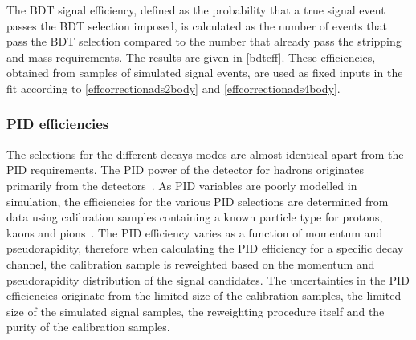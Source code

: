 The BDT signal efficiency, defined as the probability that a true signal event passes the BDT selection imposed, is calculated as the number of events that pass the BDT selection compared to the number that already pass the stripping and mass requirements. The results are given in \tab\ref{bdteff}. These efficiencies, obtained from samples of simulated signal events, are used as fixed inputs in the \CP fit according to \eqns\ref{effcorrectionads2body} and \ref{effcorrectionads4body}. 

\begin{table}[h]
\centering
{}
\caption{Summary of the BDT efficiencies used in the \CP fit.}
\label{bdteff}
\end{table}


\subsubsection{PID efficiencies}
\label{sec:cpfit:efficiencies:pid}

The selections for the different \Dz decays modes are almost identical apart from the PID requirements. The PID power of the detector for hadrons originates primarily from the \rich detectors~\cite{LHCb-DP-2012-003,richrun2}. As PID variables are poorly modelled in \lhcb simulation, the efficiencies for the various PID selections are determined from data using calibration samples containing a known particle type for protons, kaons and pions~\cite{LHCb-PUB-2016-021,LHCb-PUB-2016-005}. The PID efficiency varies as a function of momentum and pseudorapidity, therefore when calculating the PID efficiency for a specific decay channel, the calibration sample is reweighted based on the momentum and pseudorapidity distribution of the signal candidates. The uncertainties in the PID efficiencies originate from the limited size of the calibration samples, the limited size of the simulated signal samples, the reweighting procedure itself and the purity of the calibration samples.

